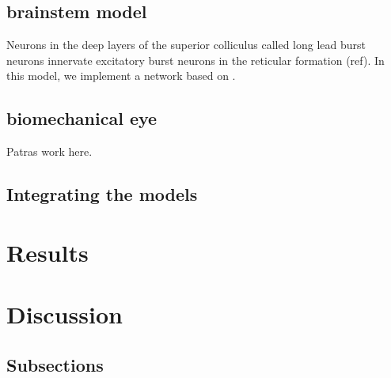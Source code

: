 \documentclass{frontiersSCNS}
\begin{document}

\subsection{brainstem model}

Neurons in the deep layers of the superior colliculus called long lead
burst neurons innervate excitatory burst neurons in the reticular
formation (ref). In this model, we implement a network based
on .

\subsection{biomechanical eye}

Patras work here.

\subsection{Integrating the models}



\section{Results}


\section{Discussion}


\subsection{Subsections}

\end{document}
